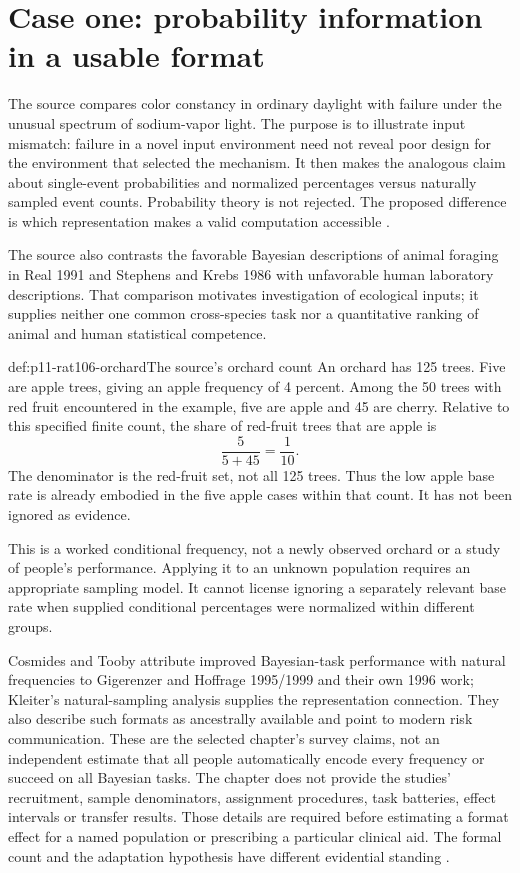 \section{Case one: probability information in a usable format}
\label{sec:p11-rat106-frequencies}

The source compares color constancy in ordinary daylight with failure
under the unusual spectrum of sodium-vapor light. The purpose is to
illustrate input mismatch: failure in a novel input environment need
not reveal poor design for the environment that selected the mechanism.
It then makes the analogous claim about single-event probabilities and
normalized percentages versus naturally sampled event counts.
Probability theory is not rejected. The proposed difference is which
representation makes a valid computation accessible
\cite[p.~636]{CosmidesTooby2021Adaptationism}.

The source also contrasts the favorable Bayesian descriptions of animal
foraging in Real 1991 and Stephens and Krebs 1986 with unfavorable
human laboratory descriptions. That comparison motivates investigation
of ecological inputs; it supplies neither one common cross-species task
nor a quantitative ranking of animal and human statistical competence.

\begin{hbexample}{def:p11-rat106-orchard}{The source's orchard count}
An orchard has 125 trees. Five are apple trees, giving an apple frequency
of 4 percent. Among the 50 trees with red fruit encountered in the
example, five are apple and 45 are cherry. Relative to this specified
finite count, the share of red-fruit trees that are apple is
\[
                         \frac{5}{5+45}=\frac{1}{10}.
\]
The denominator is the red-fruit set, not all 125 trees. Thus the low
apple base rate is already embodied in the five apple cases within
that count. It has not been ignored as evidence.

This is a worked conditional frequency, not a newly observed orchard
or a study of people's performance. Applying it to an unknown population
requires an appropriate sampling model. It cannot license ignoring a
separately relevant base rate when supplied conditional percentages
were normalized within different groups.
\end{hbexample}

Cosmides and Tooby attribute improved Bayesian-task performance with
natural frequencies to Gigerenzer and Hoffrage 1995/1999 and their own
1996 work; Kleiter's natural-sampling analysis supplies the representation
connection. They also describe such formats as ancestrally available
and point to modern risk communication. These are the selected chapter's
survey claims, not an independent estimate that all people automatically
encode every frequency or succeed on all Bayesian tasks. The chapter
does not provide the studies' recruitment, sample denominators,
assignment procedures, task batteries, effect intervals or transfer
results. Those details are required before estimating a format effect
for a named population or prescribing a particular clinical aid.
The formal count and the adaptation hypothesis have different evidential
standing \cite[p.~636]{CosmidesTooby2021Adaptationism}.

